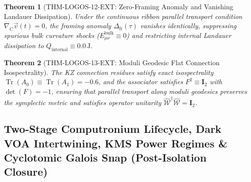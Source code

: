 \documentclass[11pt,onecolumn]{article}
\newtheorem{theorem}{Theorem}
\DeclareMathOperator{\Tr}{Tr}
\begin{document}
\begin{theorem}[THM-LOGOS-12-EXT: Zero-Framing Anomaly and Vanishing Landauer Dissipation]
\label{thm:zero_framing_landauer}
Under the continuous ribbon parallel transport condition $\nabla_{\dot{C}} \vec{v}(t) = 0$, the framing anomaly $\Delta_{\text{fr}}(\tau)$ vanishes identically, suppressing spurious bulk curvature shocks ($E_{\mu\nu}^{\text{bulk}} \equiv 0$) and restricting internal Landauer dissipation to $Q_{\text{internal}} \equiv 0.0\,\text{J}$.
\end{theorem}

\begin{theorem}[THM-LOGOS-13-EXT: Moduli Geodesic Flat Connection Isospectrality]
\label{thm:logos_13_ext}
The KZ connection residues satisfy exact isospectrality $\Tr(A_0) \equiv \Tr(A_1) = -0.6$, and the associator satisfies $F^2 \equiv \mathbf{I}_2$ with $\det(F) = -1$, ensuring that parallel transport along moduli geodesics preserves the symplectic metric and satisfies operator unitarity $\hat{\mathcal{W}}^\dagger \hat{\mathcal{W}} = \mathbf{I}_2$.
\end{theorem}


\subsection{Two-Stage Computronium Lifecycle, Dark VOA Intertwining, KMS Power Regimes \& Cyclotomic Galois Snap (Post-Isolation Closure)}
\label{subsec:logos_post_isolation_closure}
\end{document}
